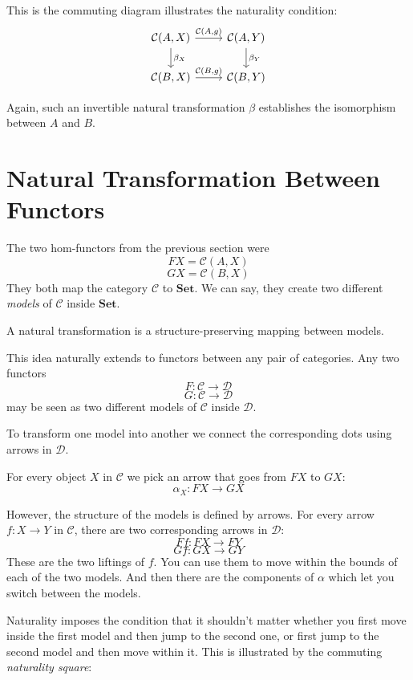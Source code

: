 \documentclass[DaoFP]{subfiles}
\begin{document}
This is the commuting diagram illustrates the naturality condition:
\[
 \begin{tikzcd}
 \mathcal{C}(A, X)
 \arrow[d, "\beta_X"]
 \arrow[r, "{\mathcal{C}(A, g)}"]
 &
 \mathcal{C}(A, Y)
  \arrow[d, "\beta_Y"]
 \\
 \mathcal{C}(B, X)
 \arrow[r, "{\mathcal{C}(B, g)}"]
& \mathcal{C}(B, Y)
 \end{tikzcd}
\]

Again, such an invertible natural transformation $\beta$ establishes the isomorphism between $A$ and $B$.

\section{Natural Transformation Between Functors}

The two hom-functors from the previous section were
\[ F X =   \mathcal{C}(A, X)\]
\[ G X =   \mathcal{C}(B, X)\]
They both map the category $\mathcal{C}$ to  $\mathbf{Set}$. We can say, they create two different \emph{models} of $\mathcal{C}$ inside $\mathbf{Set}$. 

A natural transformation is a structure-preserving mapping between models. 

This idea naturally extends to functors between any pair of categories. Any two functors
\[ F \colon \mathcal{C} \to \mathcal{D} \]
\[ G \colon \mathcal{C} \to \mathcal{D} \]
may be seen as two different models of $\mathcal{C}$ inside $\mathcal{D}$. 

To transform one model into another we connect the corresponding dots using arrows in $\mathcal{D}$. 

For every object $X$ in $\mathcal{C}$ we pick an arrow that goes from $F X$ to $G X$:
\[ \alpha_X \colon F X \to G X \]

However, the structure of the models is defined by arrows. For every arrow $f \colon X \to Y$ in $\mathcal{C}$, there are two corresponding arrows in $\mathcal{D}$:
\[ F f \colon F X \to F Y\]
\[ G f \colon G X \to G Y \]
These are the two liftings of $f$. You can use them to move within the bounds of each of the two models. And then there are the components of $\alpha$ which let you switch between the models. 

Naturality imposes the condition that it shouldn't matter whether you first move inside the first model and then jump to the second one, or first jump to the second model and then move within it. This is illustrated by the commuting \emph{naturality square}:
\end{document}
